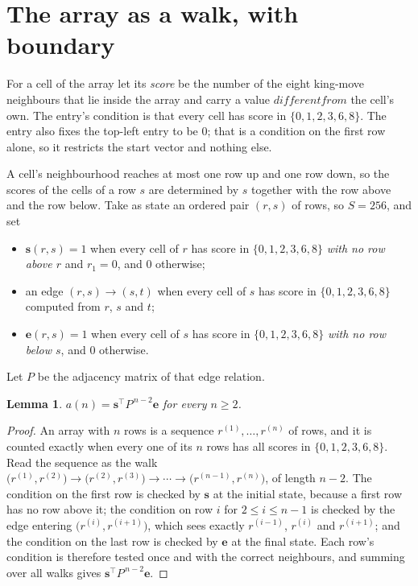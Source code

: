 \documentclass[11pt,a4paper]{article}
\theoremstyle{plain}
\newtheorem{lemma}[theorem]{Lemma}
\theoremstyle{definition}
\begin{document}
\section{The array as a walk, with boundary}

For a cell of the array let its \emph{score} be the number of the eight king-move neighbours that lie inside
the array and carry a value $different from$ the cell's own. The entry's condition is that every cell
has score in $\{0,1,2,3,6,8\}$. The entry also fixes the top-left entry to be $0$; that is a condition on the first row alone, so it restricts the start vector and nothing else.

A cell's neighbourhood reaches at most one row up and one row down, so the scores of the
cells of a row $s$ are determined by $s$ together with the row above and the row below.
Take as state an ordered pair $(r,s)$ of rows, so $S=256$, and set
\begin{itemize}
\item $\mathbf{s}(r,s)=1$ when every cell of $r$ has score in $\{0,1,2,3,6,8\}$ \emph{with no row
above $r$} and $r_1=0$, and $0$ otherwise;
\item an edge $(r,s)\to(s,t)$ when every cell of $s$ has score in $\{0,1,2,3,6,8\}$ computed from
$r$, $s$ and $t$;
\item $\mathbf{e}(r,s)=1$ when every cell of $s$ has score in $\{0,1,2,3,6,8\}$ \emph{with no row
below $s$}, and $0$ otherwise.
\end{itemize}
Let $P$ be the adjacency matrix of that edge relation.

\begin{lemma}\label{lem:walk}
$a(n)=\mathbf{s}^{\!\top}P^{\,n-2}\mathbf{e}$ for every $n\ge2$.
\end{lemma}

\begin{proof}
An array with $n$ rows is a sequence $r^{(1)},\dots,r^{(n)}$ of rows, and it is counted
exactly when every one of its $n$ rows has all scores in $\{0,1,2,3,6,8\}$. Read the sequence as the
walk $\bigl(r^{(1)},r^{(2)}\bigr)\to\bigl(r^{(2)},r^{(3)}\bigr)\to\cdots\to
\bigl(r^{(n-1)},r^{(n)}\bigr)$, of length $n-2$. The condition on the first row is
checked by $\mathbf{s}$ at the initial state, because a first row has no row above it; the
condition on row $i$ for $2\le i\le n-1$ is checked by the edge entering
$\bigl(r^{(i)},r^{(i+1)}\bigr)$, which sees exactly $r^{(i-1)}$, $r^{(i)}$ and
$r^{(i+1)}$; and the condition on the last row is checked by $\mathbf{e}$ at the final
state. Each row's condition is therefore tested once and with the correct neighbours, and
summing over all walks gives $\mathbf{s}^{\!\top}P^{\,n-2}\mathbf{e}$.
\end{proof}
\end{document}
